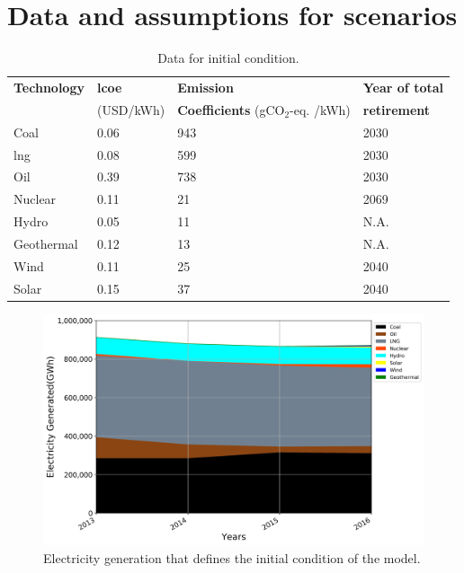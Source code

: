 \section{Data and assumptions for scenarios} \label{Appendix}

\begin{table}[!ht]
	\caption{Data for initial condition.}
	\vspace{0.1in}
	\begin{tabularx}{1.2\textwidth}{p{} p{} p{} p{}}
		\hline
\textbf{Technology} & \textbf{\gls{lcoe}} \cite{lazard_lazards_2016} & \textbf{Emission} & \textbf{Year of total}\\
  & (USD/kWh) & \textbf{Coefficients} \cite{noauthor_electricity_2019} (gCO$_2$-eq. /kWh) & \textbf{retirement} \\
\hline
Coal & 0.06 & 943 & 2030 \\
\gls{lng} & 0.08 & 599 & 2030 \\
Oil & 0.39 & 738 & 2030 \\
Nuclear & 0.11 & 21 & 2069 \\
Hydro & 0.05 & 11 & N.A. \\
Geothermal & 0.12 & 13 & N.A. \\
Wind & 0.11 & 25 & 2040 \\
Solar & 0.15 & 37 & 2040 \\
\hline 
\end{tabularx}
\label{init-eco}
\end{table}

\begin{figure}[h] 
\centering
\label{ic-elc}
\includegraphics[scale=0.5]{figures/IC}
\caption{Electricity generation that defines the initial condition of the model.}
\end{figure}

